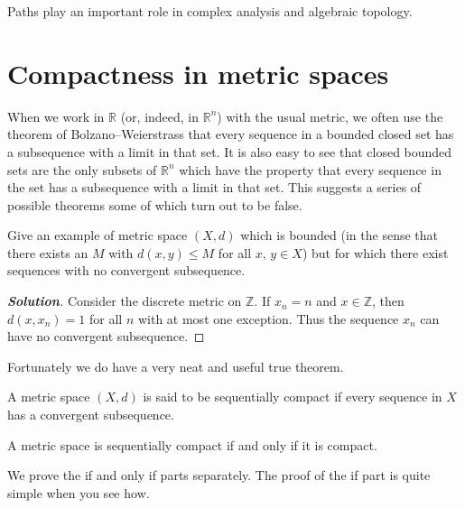 Paths play an important role in complex analysis and algebraic topology.













\section{Compactness in metric spaces} When we work in ${\mathbb R}$
(or, indeed, in ${\mathbb R}^{n}$) with the usual metric,
we often use the theorem of Bolzano--Weierstrass that every
sequence in a bounded closed set has a subsequence with a limit
in that set. It is also easy to see that closed bounded
sets are the only subsets of ${\mathbb R}^{n}$ which have the
property that every sequence in the set
has a subsequence with a limit in that set. This suggests
a series of possible theorems some of which turn out to be false.



\begin{theorem}\label{T;bounded not convergent}
Give an example of metric space $(X,d)$ which is bounded (in the sense that there exists an $M$
with $d(x,y)\leq M$ for all $x,\,y\in X$) but
for which there exist sequences with no convergent subsequence.
\end{theorem}
\begin{proof}[\bf Solution] Consider the discrete metric on
${\mathbb Z}$. If $x_{n}=n$ and $x\in {\mathbb Z}$,
then $d(x,x_{n})=1$ for all $n$
with at most one exception. Thus the sequence $x_{n}$
can have no convergent subsequence.
\end{proof}


Fortunately we do have a very neat and useful true theorem.
\begin{definition}\label{D;sequential compactness}
A metric space $(X,d)$ is said to be
sequentially compact if every sequence in $X$ has a
convergent subsequence.
\end{definition}

\begin{theorem}\label{T;sequence same}
A metric space is sequentially compact if and only if it
is compact.
\end{theorem}

We prove the if and only if parts separately.
The proof of the if part is quite simple when you see how.




